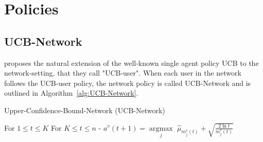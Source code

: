 \documentclass{article}
\begin{document}
\section{Policies}

\subsection{UCB-Network}

\citep{DBLP:journals/corr/KollaJG16} proposes the natural extension of the well-known single agent policy UCB to the network-setting, that they call "UCB-user". When each user in the network follows the UCB-user policy, the network policy is called UCB-Network and is outlined in Algorithm~\ref{alg:UCB-Network}.
\begin{algorithm}[htb]
   \caption{Upper-Confidence-Bound-Network (UCB-Network)}
   \label{alg:UCB-Network}
\begin{algorithmic}
    For $1 \leq t \leq K$
    For $K \leq t \leq n$
   \STATE - $a^v(t+1) = \underset{j}{\operatorname{argmax}} \, \, \hat{\mu}_{m_j^v(t)} + \sqrt{\frac{2 \ln t}{m_j^v(t)}}$
\end{algorithmic}
\end{algorithm}
\end{document}
